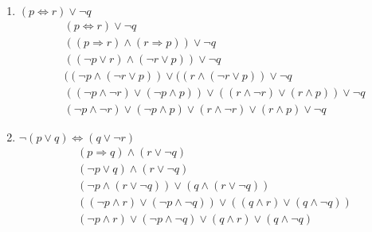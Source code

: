 \documentclass[10pt,letterpaper,fleqn]{article}
\begin{document}
\begin{enumerate}
\begin{enumerate}
            \item \textbf{ $ (p \Leftrightarrow r) \vee \neg q $}
            \begin{equation*}
                \begin{split}
                    &   (p \Leftrightarrow r) \vee \neg q
                    \\& ( (p \Rightarrow r) \wedge (r \Rightarrow p) )  \vee \neg q
                    \\& ( (\neg p \vee r) \wedge (\neg r \vee p) )  \vee \neg q
                    \\& ( (\neg p \wedge (\neg r \vee p) ) \vee ( (r \wedge (\neg r \vee p) )  \vee \neg q
                    \\& ( (\neg p \wedge \neg r) \vee (\neg p \wedge p) )  \vee( (r \wedge \neg r) \vee (r \wedge p) ) \vee \neg q
                    \\& (\neg p \wedge \neg r) \vee (\neg p \wedge p) \vee (r \wedge \neg r) \vee (r \wedge p)\vee \neg q
                \end{split}
            \end{equation*}
            
            \item \textbf{ $\neg(p \vee q) \Leftrightarrow (q \vee \neg r) $}
            \begin{equation*}
                \begin{split}
                    &   (p \Rightarrow q) \wedge (r \vee \neg q)
                    \\& (\neg p \vee  q) \wedge (r \vee \neg q)
                    \\& (\neg p \wedge  (r \vee \neg q)  ) \vee (q \wedge  (r \vee \neg q)  )
                    \\& ((\neg p \wedge r) \vee (\neg p \wedge \neg q)) \vee ((q \wedge r) \vee (q \wedge \neg q))
                    \\& (\neg p \wedge r) \vee (\neg p \wedge \neg q) \vee  (q \wedge r) \vee (q \wedge \neg q)
                \end{split}
            \end{equation*}
            

\end{enumerate}
\end{enumerate}
\end{document}
